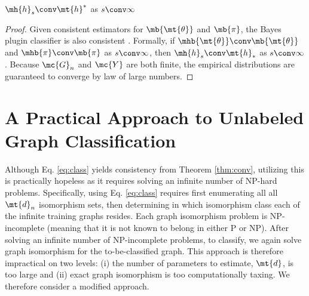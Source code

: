 \documentclass[10pt,journal,cspaper,compsoc]{IEEEtran}
\begin{document}
\begin{thm} \label{thm:conv}
	$\mh{h}_s \conv \mt{h}^*$ as $s \conv \infty$
\end{thm}

\begin{proof}
Given consistent estimators for $\mb{\mt{\theta}}$ and $\mb{\pi}$, the Bayes plugin classifier is also consistent \cite{DEV96}.  Formally, if $\mhb{\mt{\theta}} \conv \mb{\mt{\theta}}$ and $\mhb{\pi} \conv \mb{\pi}$ as $s \conv \infty$, then $\mh{h}_s \conv \mt{h}_*$ as $s\conv \infty$.  Because $\mc{G}_n$ and $\mc{Y}$ are both finite, the empirical distributions are guaranteed to converge by law of large numbers.  
\end{proof}



\section{A Practical Approach to Unlabeled Graph Classification} %
\label{sec:a_practical_approach_to_unlabeled_graph_classification}

Although Eq. \ref{eq:class} yields consistency from Theorem \ref{thm:conv}, utilizing this is practically hopeless as it requires solving an infinite number of NP-hard problems.  Specifically, using Eq. \ref{eq:class} requires first enumerating all all $\mt{d}_n$ isomorphism sets, then determining in which isomorphism class each of the infinite training graphs resides.  Each graph isomorphism problem is NP-incomplete (meaning that it is not known to belong in either P or NP).  After solving an infinite number of NP-incomplete problems, to classify, we again solve graph isomorphism for the to-be-classified graph.  This approach is therefore impractical on two levels: (i) the number of parameters to estimate, $\mt{d}$, is too large and (ii) exact graph isomorphism is too computationally taxing.  We therefore consider a modified approach.
\end{document}
